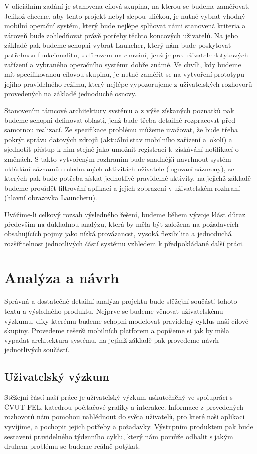 \documentclass[thesis=M,czech]{FITthesis}[2012/06/26]
\begin{document}
\begin{introduction}
V oficiálním zadání je stanovena cílová skupina, na kterou se budeme zaměřovat. Jelikož chceme, aby tento projekt nebyl slepou uličkou, je nutné vybrat vhodný mobilní operační systém, který bude nejlépe splňovat námi stanovená kriteria a zároveň bude zohledňovat právě potřeby těchto koncových uživatelů. Na jeho základě pak budeme schopni vybrat Launcher, který nám bude poskytovat potřebnou funkcionalitu, s důrazem na chování, jenž je pro uživatele dotykových zařízení a vybraného operačního systému dobře známé. Ve chvíli, kdy budeme mít specifikovanou cílovou skupinu, je nutné zaměřit se na vytvoření prototypu jejího pravidelného režimu, který nejlépe vypozorujeme z uživatelských rozhovorů provedených na základě jednoduché osnovy.

Stanovením rámcové architektury systému a z výše získaných poznatků pak budeme schopni definovat oblasti, jenž bude třeba detailně rozpracovat před samotnou realizací. Ze specifikace problému můžeme uvažovat, že bude třeba pokrýt správu datových zdrojů (aktuální stav mobilního zařízení a~okolí) a sjednotit přístup k nim stejně jako umožnit registraci k~získávání notifikací o změnách. S takto vytvořeným rozhraním bude snadnější navrhnout systém ukládání záznamů o sledovaných aktivitách uživatele (logovací záznamy), ze kterých pak bude potřeba získat jednotlivé pravidelné aktivity, na jejichž základě budeme provádět filtrování aplikací a jejich zobrazení v uživatelském rozhraní (hlavní obrazovka Launcheru). 

Uvážíme-li celkový rozsah výsledného řešení, budeme během vývoje klást důraz především na důkladnou analýzu, která by měla být založena na požadavcích obsahujících pojmy jako nízká provázanost, vysoká flexibilita a jednoduchá rozšiřitelnost jednotlivých částí systému vzhledem k předpokládané další práci.
\end{introduction}

\chapter{Analýza a návrh}
Správná a dostatečně detailní analýza projektu bude stěžejní součástí tohoto textu a výsledného produktu. Nejprve se budeme věnovat uživatelskému výzkumu, díky kterému budeme schopni modelovat pravidelný cyklus naší cílové skupiny. Provedeme rešerši mobilních platforem a popíšeme si jak by měla vypadat architektura systému, na jejímž základě pak provedeme návrh jednotlivých součástí.

\section{Uživatelský výzkum}
Stěžejní částí naší práce je uživatelský výzkum uskutečněný ve spolupráci s ČVUT FEL, katedrou počítačové grafiky a interakce. Informace z provedených rozhovorů nám pomohou nahlédnout do světa uživatelů, pro které naši aplikaci vyvíjíme, a pochopit jejich potřeby a požadavky. Výstupním produktem pak bude sestavení pravidelného týdenního cyklu, který nám pomůže odhalit s jakým druhem problému se budeme reálně potýkat.
\end{document}
